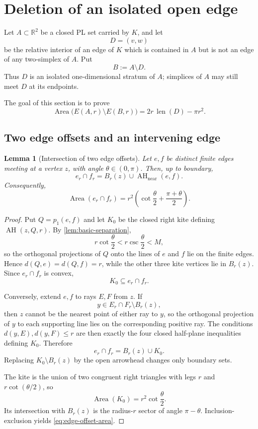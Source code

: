 \documentclass[11pt]{article}
\newtheorem{lemma}[theorem]{Lemma}
\newcommand{\R}{\mathbb R}
\newcommand{\Area}{\operatorname{Area}}
\newcommand{\len}{\operatorname{len}}
\newcommand{\AH}{\operatorname{AH}}
\newcommand{\AHnear}{\operatorname{AH}_{\mathrm{near}}}
\numberwithin{equation}{section}
\begin{document}
 \section{Deletion of an isolated open edge}\label{sec:edge-deletion}

Let $A\subset\R^2$ be a closed PL set carried by $K$, and let
\[
D=(v,w)
\]
be the relative interior of an edge of $K$ which is contained in $A$ but is not an edge of any two-simplex of $A$. Put
\[
B:=A\setminus D.
\]
Thus $D$ is an isolated one-dimensional stratum of $A$; simplices of $A$ may still meet $D$ at its endpoints.

The goal of this section is to prove
\begin{equation}\label{eq:segment-delta-target}
\boxed{
\Area\bigl(E(A,r)\setminus E(B,r)\bigr)
=2r\,\len(D)-\pi r^2.
}
\end{equation}

\subsection{Two edge offsets and an intervening edge}

\begin{lemma}[Intersection of two edge offsets]\label{lem:edge-offset-intersection}
Let $e,f$ be distinct finite edges meeting at a vertex $z$, with angle $\theta\in(0,\pi)$. Then, up to boundary,
\[
\boxed{
e_r\cap f_r
=
B_r(z)\cup\AHnear(e,f).
}
\]
Consequently,
\begin{equation}\label{eq:edge-offset-area}
\boxed{
\Area(e_r\cap f_r)
=
r^2\left(\cot\frac\theta2+\frac{\pi+\theta}{2}\right).
}
\end{equation}
\end{lemma}

\begin{proof}
Put $Q=p_1(e,f)$ and let $K_0$ be the closed right kite defining $\AH(z,Q,r)$. By \cref{lem:basic-separation},
\[
r\cot\frac\theta2<r\csc\frac\theta2<M,
\]
so the orthogonal projections of $Q$ onto the lines of $e$ and $f$ lie on the finite edges. Hence $d(Q,e)=d(Q,f)=r$, while the other three kite vertices lie in $B_r(z)$. Since $e_r\cap f_r$ is convex,
\[
K_0\subseteq e_r\cap f_r.
\]

Conversely, extend $e,f$ to rays $E,F$ from $z$. If
\[
y\in E_r\cap F_r\setminus B_r(z),
\]
then $z$ cannot be the nearest point of either ray to $y$, so the orthogonal projection of $y$ to each supporting line lies on the corresponding positive ray. The conditions $d(y,E),d(y,F)\le r$ are then exactly the four closed half-plane inequalities defining $K_0$. Therefore
\[
e_r\cap f_r=B_r(z)\cup K_0.
\]
Replacing $K_0\setminus B_r(z)$ by the open arrowhead changes only boundary sets.

The kite is the union of two congruent right triangles with legs $r$ and $r\cot(\theta/2)$, so
\[
\Area(K_0)=r^2\cot\frac\theta2.
\]
Its intersection with $B_r(z)$ is the radius-$r$ sector of angle $\pi-\theta$. Inclusion-exclusion yields \eqref{eq:edge-offset-area}.
\end{proof}
\end{document}
